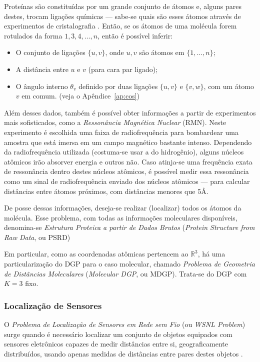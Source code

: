 Proteínas são constituídas por um grande conjunto de átomos e, alguns pares destes, trocam ligações químicas --- sabe-se quais são esses átomos através de experimentos de cristalografia \cite{ramachandran1974MolStructure}. Então, se os átomos de uma molécula forem rotulados da forma $1,3,4,\dots,n$, então é possível inferir: 
\begin{itemize}
	\item O conjunto de ligações $\{u,v\}$, onde $u,v$ são átomos em $\{1,\dots,n\}$;
	\item A distância entre $u$ e $v$ (para cara par ligado);
	\item O ângulo interno $\theta_v$ definido por duas ligações $\{u,v\}$ e $\{v,w\}$, com um átomo $v$ em comum. (veja o Apêndice~\ref{ap:cos})
\end{itemize} 

Além desses dados, também é possível obter informações a partir de experimentos mais sofisticados, como a \textit{Ressonância Magnética Nuclear} (RMN). Neste experimento é escolhida uma faixa de radiofrequência para bombardear uma amostra que está imersa em um campo magnético bastante intenso. Dependendo da radiofrequência utilizada (costuma-se usar a do hidrogênio), alguns núcleos atômicos irão absorver energia e outros não. Caso atinja-se uma frequência exata de ressonância dentro destes núcleos atômicos, é possível medir essa ressonância como um sinal de radiofrequência enviado dos núcleos atômicos --- para calcular distâncias entre átomos próximos, com distâncias menores que 5\AA.

De posse dessas informações, deseja-se realizar (localizar) todos os átomos da molécula. Esse problema, com todas as informações moleculares disponíveis, denomina-se \textit{Estrutura Proteica a partir de Dados Brutos} (\textit{Protein Structure from Raw Data}, ou PSRD)

Em particular, como as coordenadas atômicas pertencem ao $\mathbb{R}^3$, há uma particularização do DGP para o caso molecular, chamado \textit{Problema de Geometria de Distâncias Moleculares} (\textit{Molecular DGP}, ou MDGP). Trata-se do DGP com $K = 3$ fixo.

\subsubsection{Localização de Sensores}

O \textit{Problema de Localização de Sensores em Rede sem Fio} (ou \textit{WSNL Problem}) surge quando é necessário localizar um conjunto de objetos equipados com sensores eletrônicos capazes de medir distâncias entre si, geograficamente distribuídos, usando apenas medidas de distâncias entre pares destes objetos \cite{yemini1978positioning}. 

